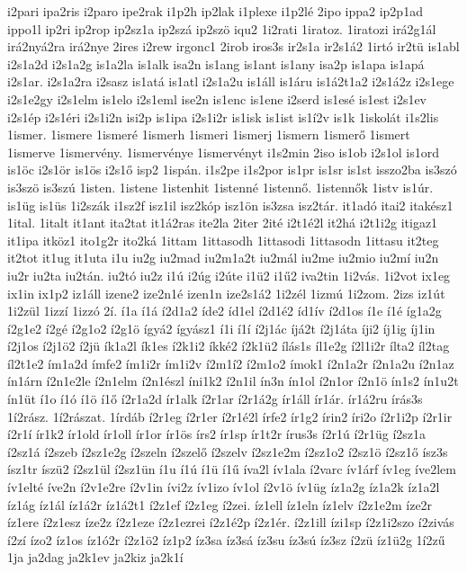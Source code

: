 {i2pari
ipa2ris
i2paro
ipe2rak
i1p2h
ip2lak
i1plexe
i1p2lé
2ipo
ippa2
ip2p1ad
ippo1l
ip2ri
ip2rop
ip2sz1a
ip2szá
ip2szö
iqu2
1i2rati
1iratoz.
1iratozi
irá2g1ál
irá2nyá2ra
irá2nye
2ires
i2rew
irgonc1
2irob
iros3s
ir2s1a
ir2s1á2
1irtó
ir2tü
is1abl
i2s1a2d
i2s1a2g
is1a2la
is1alk
isa2n
is1ang
is1ant
is1any
isa2p
is1apa
is1apá
i2s1ar.
i2s1a2ra
i2sasz
is1atá
is1atl
i2s1a2u
is1áll
is1áru
is1á2t1a2
i2s1á2z
i2s1ege
i2s1e2gy
i2s1elm
is1elo
i2s1eml
ise2n
is1enc
is1ene
i2serd
is1esé
is1est
i2s1ev
i2s1ép
i2s1éri
i2s1i2n
isi2p
is1ipa
i2s1i2r
is1isk
is1ist
is1í2v
is1k
1iskolát
i1s2lis
1ismer.
1ismere
1ismeré
1ismerh
1ismeri
1ismerj
1ismern
1ismerő
1ismert
1ismerve
1ismervény.
1ismervénye
1ismervényt
i1s2min
2iso
is1ob
i2s1ol
is1ord
is1öc
i2s1ör
is1ös
i2s1ő
isp2
1ispán.
i1s2pe
i1s2por
is1pr
is1sr
is1st
isszo2ba
is3szó
is3szö
is3szú
1isten.
1istene
1istenhit
1istenné
1istennő.
1istennők
1istv
is1úr.
is1üg
is1üs
1i2szák
i1sz2f
isz1il
isz2kóp
isz1ön
is3zsa
isz2tár.
it1adó
itai2
itakész1
1ital.
1italt
it1ant
ita2tat
it1á2ras
ite2la
2iter
2ité
i2t1é2l
it2há
i2t1i2g
itigaz1
it1ipa
itköz1
ito1g2r
ito2ká
1ittam
1ittasodh
1ittasodi
1ittasodn
1ittasu
it2teg
it2tot
it1ug
it1uta
i1u
iu2g
iu2mad
iu2m1a2t
iu2mál
iu2me
iu2mio
iu2mí
iu2n
iu2r
iu2ta
iu2tán.
iu2tó
iu2z
i1ú
i2úg
i2úte
i1ü2
i1ű2
iva2tin
1i2vás.
1i2vot
ix1eg
ix1in
ix1p2
iz1áll
izene2
ize2n1é
izen1n
ize2s1á2
1i2zél
1izmú
1i2zom.
2izs
iz1út
1i2zül
1izzí
1izzó
2í.
í1a
í1á
í2d1a2
íde2
íd1el
í2d1é2
íd1ív
í2d1os
í1e
í1é
íg1a2g
í2g1e2
í2gé
í2g1o2
í2g1ö
ígyá2
ígyász1
í1i
í1í
í2j1ác
íjá2t
í2j1áta
íji2
íj1ig
íj1in
í2j1os
í2j1ö2
í2jü
ík1a2l
ík1es
í2k1i2
íkké2
í2k1ü2
ílás1s
íl1e2g
í2l1i2r
ílta2
íl2tag
íl2t1e2
ím1a2d
ímfe2
ím1i2r
ím1i2v
í2m1í2
í2m1o2
ímok1
í2n1a2r
í2n1a2u
í2n1az
ín1árn
í2n1e2le
í2n1elm
í2n1észl
íni1k2
í2n1il
ín3n
ín1ol
í2n1or
í2n1ö
ín1s2
ín1u2t
ín1üt
í1o
í1ó
í1ö
í1ő
í2r1a2d
ír1alk
í2r1ar
í2r1á2g
ír1áll
ír1ár.
ír1á2ru
írás3s
1í2rász.
1í2rászat.
1írdáb
í2r1eg
í2r1er
í2r1é2l
írfe2
ír1g2
írin2
íri2o
í2r1i2p
í2r1ir
í2r1í
ír1k2
ír1old
ír1oll
ír1or
ír1ös
írs2
ír1sp
ír1t2r
írus3s
í2r1ú
í2r1üg
í2sz1a
í2sz1á
í2szeb
í2sz1e2g
í2szeln
í2szelő
í2szelv
í2sz1e2m
í2sz1o2
í2sz1ö
í2sz1ő
ísz3s
ísz1tr
íszü2
í2sz1ül
í2sz1ün
í1u
í1ú
í1ü
í1ű
íva2l
ív1ala
í2varc
ív1árf
ív1eg
íve2lem
ív1elté
íve2n
í2v1e2re
í2v1in
ívi2z
ív1izo
ív1ol
í2v1ö
ív1üg
íz1a2g
íz1a2k
íz1a2l
íz1ág
íz1ál
íz1á2r
íz1á2t1
í2z1ef
í2z1eg
í2zei.
íz1ell
íz1eln
íz1elv
í2z1e2m
íze2r
íz1ere
í2z1esz
íze2z
í2z1eze
í2z1ezrei
í2z1é2p
í2z1ér.
í2z1ill
ízi1sp
í2z1i2szo
í2zivás
í2zí
ízo2
íz1os
íz1ó2r
í2z1ö2
íz1p2
íz3sa
íz3sá
íz3su
íz3sú
íz3sz
í2zü
íz1ü2g
1í2zű
1ja
ja2dag
ja2k1ev
ja2kiz
ja2k1í
}
